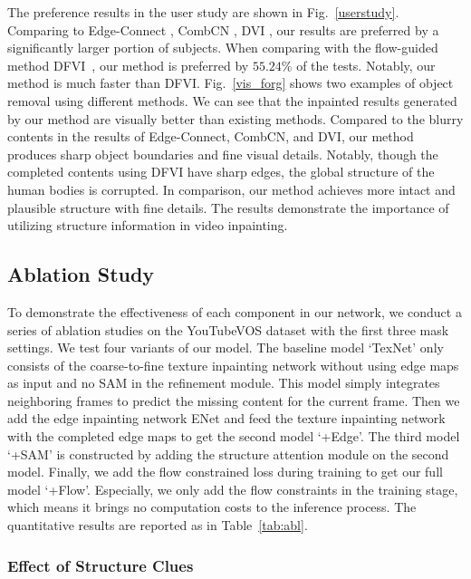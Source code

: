 The preference results in the user study are shown in Fig.~\ref{userstudy}. 
Comparing to Edge-Connect \cite{nazeri2019edgeconnect}, CombCN \cite{wang2019video}, DVI \cite{Kim_2019_CVPR1}, our results are preferred by a significantly larger portion of subjects.
%
When comparing with the flow-guided method DFVI~\cite{Xu_2019_CVPR}, our method is preferred by $55.24\%$ of the tests. 
Notably, our method is much faster than DFVI.
%
Fig.~\ref{vis_forg} shows two examples of object removal using different methods. 
We can see that the inpainted results generated by our method are visually better than existing methods.
Compared to the blurry contents in the results of Edge-Connect, CombCN, and DVI, our method produces sharp object boundaries and fine visual details. Notably, though the completed contents using DFVI have sharp edges, the global structure of the human bodies is corrupted. In comparison, our method achieves more intact and plausible structure with fine details.
The results demonstrate the importance of utilizing structure information in video inpainting. 




\subsection{Ablation Study}
To demonstrate the effectiveness of each component in our network, we conduct a series of ablation studies on the YouTubeVOS dataset with the first three mask settings. 
%
We test four variants of our model. 
The baseline model `TexNet' only consists of the coarse-to-fine texture inpainting network without using edge maps as input and no SAM in the refinement module.
This model simply integrates neighboring frames to predict the missing content for the current frame.
%
Then we add the edge inpainting network ENet and feed the texture inpainting network with the completed edge maps to get the second model `+Edge'.
The third model `+SAM' is constructed by adding the structure attention module on the second model. 
Finally, we add the flow constrained loss during training to get our full model `+Flow'. Especially, we only add the flow constraints in the training stage, which means it brings no computation costs to the inference process.
The quantitative results are reported as in Table~\ref{tab:abl}. 

%

\subsubsection{Effect of Structure Clues}


